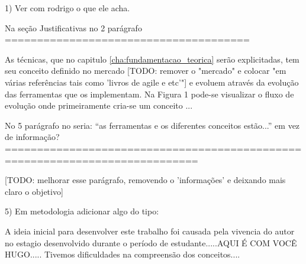 1) Ver com rodrigo o que ele acha.

  Na seção Justificativas no 2 parágrafo
  ======================================

  As técnicas, que no capitulo \ref{cha:fundamentacao_teorica} serão explicitadas, tem seu conceito definido no mercado [TODO: remover o "mercado" e colocar "em várias referências tais como 'livros de agile e etc'"] e evoluem através da evolução das ferramentas que os implementam. Na Figura 1 pode-se visualizar o fluxo de evolução onde primeiramente cria-se um conceito ...


  No 5 parágrafo no seria: “as ferramentas e os diferentes conceitos estão...” em vez de informação?
  ============================================================================

  [TODO: melhorar esse parágrafo, removendo o 'informações' e deixando mais claro o objetivo]


5) Em metodologia adicionar algo do tipo:

    A ideia inicial para desenvolver este trabalho foi causada pela vivencia do autor no estagio desenvolvido durante o período de estudante.....AQUI É COM VOCÊ HUGO..... Tivemos dificuldades na compreensão dos conceitos....